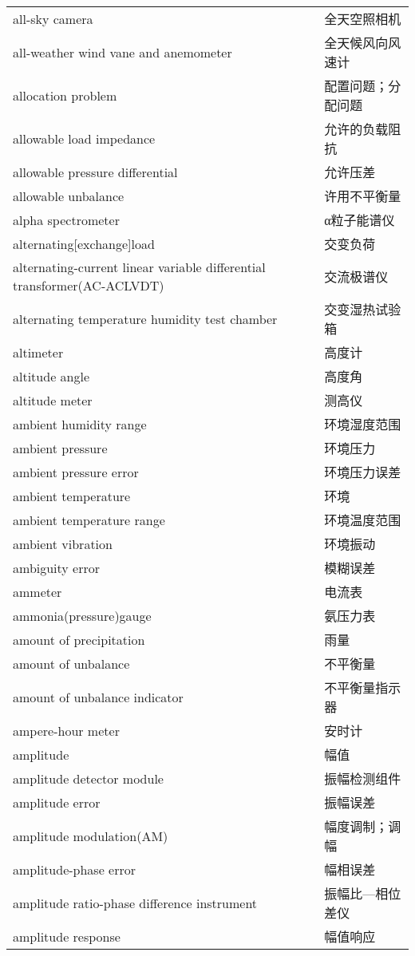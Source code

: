 \documentclass[
]{article}
\begin{document}
\begin{longtable}[]{@{}ll@{}}
all-sky camera & 全天空照相机 \\
all-weather wind vane and anemometer & 全天候风向风速计 \\
allocation problem & 配置问题；分配问题 \\
allowable load impedance & 允许的负载阻抗 \\
allowable pressure differential & 允许压差 \\
allowable unbalance & 许用不平衡量 \\
alpha spectrometer & α粒子能谱仪 \\
alternating{[}exchange{]}load & 交变负荷 \\
alternating-current linear variable differential transformer(AC-ACLVDT)
& 交流极谱仪 \\
alternating temperature humidity test chamber & 交变湿热试验箱 \\
altimeter & 高度计 \\
altitude angle & 高度角 \\
altitude meter & 测高仪 \\
ambient humidity range & 环境湿度范围 \\
ambient pressure & 环境压力 \\
ambient pressure error & 环境压力误差 \\
ambient temperature & 环境 \\
ambient temperature range & 环境温度范围 \\
ambient vibration & 环境振动 \\
ambiguity error & 模糊误差 \\
ammeter & 电流表 \\
ammonia(pressure)gauge & 氨压力表 \\
amount of precipitation & 雨量 \\
amount of unbalance & 不平衡量 \\
amount of unbalance indicator & 不平衡量指示器 \\
ampere-hour meter & 安时计 \\
amplitude & 幅值 \\
amplitude detector module & 振幅检测组件 \\
amplitude error & 振幅误差 \\
amplitude modulation(AM) & 幅度调制；调幅 \\
amplitude-phase error & 幅相误差 \\
amplitude ratio-phase difference instrument & 振幅比---相位差仪 \\
amplitude response & 幅值响应 \\

\end{longtable}
\end{document}
